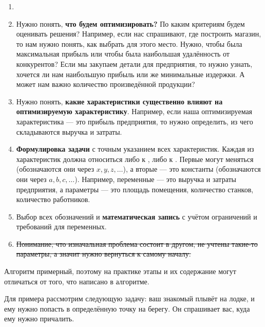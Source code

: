 \begin{enumerate}[nosep]
	\item[]
	
	\item Нужно понять, \textbf{что будем оптимизировать?} По каким критериям будем оценивать решения? Например, если нас спрашивают, где построить магазин, то нам нужно понять, как выбрать для этого место. Нужно, чтобы была максимальная прибыль или чтобы была наибольшая удалённость от конкурентов? Если мы закупаем детали для предприятия, то нужно узнать, хочется ли нам наибольшую прибыль или же минимальные издержки. А может нам важно количество произведённой продукции?
	
	\item Нужно понять, \textbf{какие характеристики существенно влияют на оптимизируемую характеристику}. Например, если наша оптимизируемая характеристика --- это прибыль предприятия, то нужно определить, из чего складываются выручка и затраты.
	
	\item \textbf{Формулировка задачи} с точным указанием всех характеристик. Каждая из характеристик должна относиться либо к , либо к . Первые могут меняться (обозначаются они через $x, y, z, \dots$), а вторые --- это константы (обозначаются они через $a, b, c, \dots$). Например, переменные --- это выручка и затраты предприятия, а параметры --- это площадь помещения, количество станков, количество работников.
	
	\item Выбор всех обозначений и \textbf{математическая запись} с учётом ограничений и требований для переменных.
	
	\item \sout{Понимание, что изначальная проблема состоит в другом, не учтены такие-то параметры, а значит нужно вернуться к самому началу.}
\end{enumerate}

\remark

Алгоритм примерный, поэтому на практике этапы и их содержание могут отличаться от того, что написано в алгоритме.

\problem[о лодке]

Для примера рассмотрим следующую задачу: ваш знакомый плывёт на лодке, и ему нужно попасть в определённую точку на берегу. Он спрашивает вас, куда ему нужно причалить.

